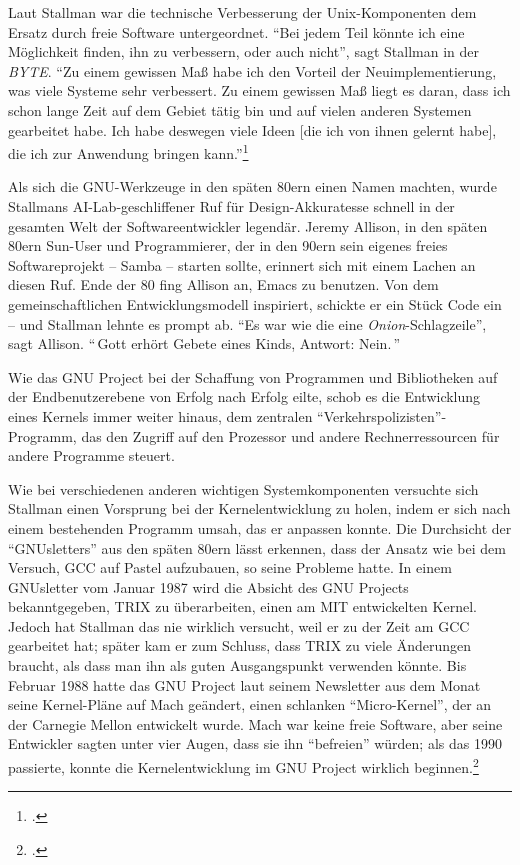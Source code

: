 Laut Stallman war die technische Verbesserung der Unix-Komponenten dem Ersatz durch freie Software untergeordnet. "`Bei jedem Teil könnte ich eine Möglichkeit finden, ihn zu verbessern, oder auch nicht"', sagt Stallman in der \textit{BYTE}. "`Zu einem gewissen Maß habe ich den Vorteil der Neuimplementierung, was viele Systeme sehr verbessert. Zu einem gewissen Maß liegt es daran, dass ich schon lange Zeit auf dem Gebiet tätig bin und auf vielen anderen Systemen gearbeitet habe. Ich habe deswegen viele Ideen [die ich von ihnen gelernt habe], die ich zur Anwendung bringen kann."'\footcite[Vgl.][]{byte}

Als sich die GNU-Werkzeuge in den späten 80ern einen Namen machten, wurde Stallmans AI-Lab-geschliffener Ruf für Design-Akkuratesse schnell in der gesamten Welt der Softwareentwickler legendär.
Jeremy Allison, in den späten 80ern Sun-User und Programmierer, der in den 90ern sein eigenes freies Softwareprojekt – Samba – starten sollte, erinnert sich mit einem Lachen an diesen Ruf. Ende der 80 fing Allison an, Emacs zu benutzen. Von dem gemeinschaftlichen Entwicklungsmodell inspiriert, schickte er ein Stück Code ein – und Stallman lehnte es prompt ab.
"`Es war wie die eine \textit{Onion}-Schlagzeile"', sagt Allison. "`\,\glq Gott erhört Gebete eines Kinds, Antwort: Nein.\grq\,"'

Wie das GNU Project bei der Schaffung von Programmen und Bibliotheken auf der Endbenutzerebene von Erfolg nach Erfolg eilte, schob es die Entwicklung eines Kernels immer weiter hinaus, dem zentralen "`Verkehrspolizisten"'-Programm, das den Zugriff auf den Prozessor und andere Rechnerressourcen für andere Programme steuert.

Wie bei verschiedenen anderen wichtigen Systemkomponenten versuchte sich Stallman einen Vorsprung bei der Kernelentwicklung zu holen, indem er sich nach einem bestehenden Programm umsah, das er anpassen konnte. Die Durchsicht der "`GNUsletters"' aus den späten 80ern lässt erkennen, dass der Ansatz wie bei dem Versuch, GCC auf Pastel aufzubauen, so seine Probleme hatte. In einem GNUsletter vom Januar 1987 wird die Absicht des GNU Projects bekanntgegeben, TRIX zu überarbeiten, einen am MIT entwickelten Kernel. Jedoch hat Stallman das nie wirklich versucht, weil er zu der Zeit am GCC gearbeitet hat; später kam er zum Schluss, dass TRIX zu viele Änderungen braucht, als dass man ihn als guten Ausgangspunkt verwenden könnte. Bis Februar  1988 hatte das GNU Project laut seinem Newsletter aus dem Monat seine Kernel-Pläne auf Mach geändert, einen schlanken "`Micro-Kernel"', der an der Carnegie Mellon entwickelt wurde. Mach war keine freie Software, aber seine Entwickler sagten unter vier Augen, dass sie ihn "`befreien"' würden; als das 1990 passierte, konnte die Kernelentwicklung im GNU Project wirklich beginnen.\footcite[Vgl.][]{hurdhist}

